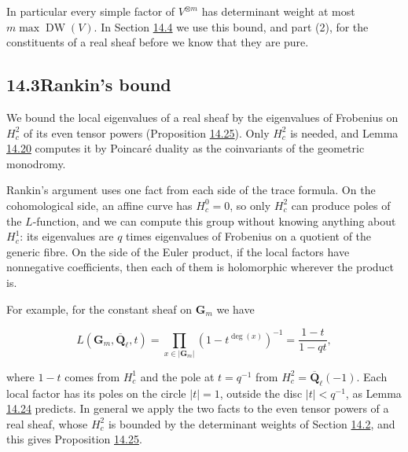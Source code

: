 \documentclass[11pt]{article}
\begin{document}
\label{bp101}%
In particular every simple factor of \(V^{\otimes m}\) has determinant weight at most \(m\max\operatorname{DW}(V)\). In Section \hyperref[bp118]{14.4} we use this bound, and part (2), for the constituents of a real sheaf before we know that they are pure.



\subsection*{\texorpdfstring{14.3\quad Rankin's bound}{14.3 Rankin's bound}}
\label{bp102}%
\label{bp103}%
We bound the local eigenvalues of a real sheaf by the eigenvalues of Frobenius on \(H^2_c\) of its even tensor powers (Proposition \hyperref[bp116]{14.25}). Only \(H^2_c\) is needed, and Lemma \hyperref[bp104]{14.20} computes it by Poincaré duality as the coinvariants of the geometric monodromy.

Rankin's argument uses one fact from each side of the trace formula. On the cohomological side, an affine curve has \(H^0_c=0\), so only \(H^2_c\) can produce poles of the \(L\)-function, and we can compute this group without knowing anything about \(H^1_c\): its eigenvalues are \(q\) times eigenvalues of Frobenius on a quotient of the generic fibre. On the side of the Euler product, if the local factors have nonnegative coefficients, then each of them is holomorphic wherever the product is.

For example, for the constant sheaf on \(\mathbf G_m\) we have

\[
L(\mathbf G_m,\overline{\mathbf Q}_\ell,t)=\prod_{x\in|\mathbf G_m|}(1-t^{\deg(x)})^{-1}
=\frac{1-t}{1-qt},
\]

where \(1-t\) comes from \(H^1_c\) and the pole at \(t=q^{-1}\) from \(H^2_c=\overline{\mathbf Q}_\ell(-1)\). Each local factor has its poles on the circle \(|t|=1\), outside the disc \(|t|<q^{-1}\), as Lemma \hyperref[bp113]{14.24} predicts. In general we apply the two facts to the even tensor powers of a real sheaf, whose \(H^2_c\) is bounded by the determinant weights of Section \hyperref[bp69]{14.2}, and this gives Proposition \hyperref[bp116]{14.25}.
\end{document}
